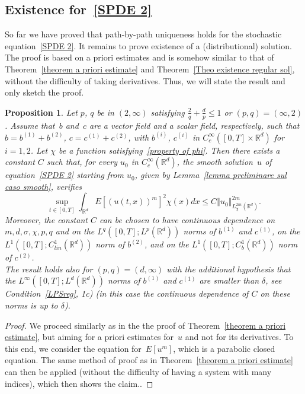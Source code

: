 \documentclass[a4paper,10pt]{article}
\newtheorem{proposition}[theorem]{Proposition}
\newcommand\1{\mathbbm{1}}
\numberwithin{equation}{section}
\begin{document}
\subsection{Existence for~\eqref{SPDE 2}}

So far we have proved that path-by-path uniqueness holds for the stochastic equation~\eqref{SPDE 2}. It remains to prove existence of a (distributional) solution. The proof is based on a priori estimates and is somehow similar to that of Theorem~\ref{theorem a priori estimate} and Theorem~\ref{Theo existence regular sol}, without the difficulty of taking derivatives. Thus, we will state the result and only sketch the proof.

\begin{proposition}
Let $p$, $q$ be in $(2,\infty)$ satisfying $\frac2q+\frac{d}{p}\le1$ or $(p,q)=(\infty,2)$. Assume that~$b$ and~$c$ are a vector field and a scalar field, respectively, such that $b=b^{(1)}+b^{(2)}$, $c=c^{(1)}+c^{(2)}$, with $b^{(i)}$, $c^{(i)}$ in $C^\infty_c([0,T]\times\mathbb{R}^d)$ for $i=1,2$. Let $\chi$ be a function satisfying~\eqref{property of phi}. Then there exists a constant $C$ such that, for every $u_0$ in $C^\infty_c(\mathbb{R}^d)$, the smooth solution~$u$ of equation~\eqref{SPDE 2} starting from $u_0$, given by Lemma~\ref{lemma preliminare sul caso smooth}, verifies
\begin{equation*}
\sup_{t\in [0,T]  } \int_{\mathbb{R}^{d}}E\left[(u(t,x))^{m}\right]^{2}\chi(x) dx\leq C\left\Vert u_{0}\right\Vert_{L_{\chi}^{2m}(\mathbb{R}^{d})}^{2m}.
\end{equation*}
Moreover, the constant $C$ can be chosen to have continuous dependence on $m,d,\sigma,\chi,p,q$ and on the $L^q([0,T];L^p(\mathbb{R}^d))$ norms of $b^{(1)}$ and $c^{(1)}$, on the $L^1([0,T];C^1_{lin}(\mathbb{R}^d))$ norm of $b^{(2)}$, and on the $L^1([0,T];C^1_b(\mathbb{R}^d))$ norm of $c^{(2)}$.\\
The result holds also for $(p,q)=(d,\infty)$ with the additional hypothesis that the $L^\infty([0,T];L^d(\mathbb{R}^d))$ norms of $b^{(1)}$ and $c^{(1)}$ are smaller than $\delta$, see Condition~\ref{LPSreg}, \textup{1c)} \textup{(}in this case the continuous dependence of $C$ on these norms is up to $\delta$\textup{)}.
\end{proposition}

\begin{proof}
We proceed similarly as in the the proof of Theorem~\ref{theorem a priori estimate}, but aiming for a priori estimates for~$u$ and not for its derivatives. To this end, we consider the equation for~$E[u^m]$, which is a parabolic closed equation. The same method of proof as in Theorem~\ref{theorem a priori estimate} can then be applied (without the difficulty of having a system with many indices), which then shows the claim..
\end{proof}
\end{document}
